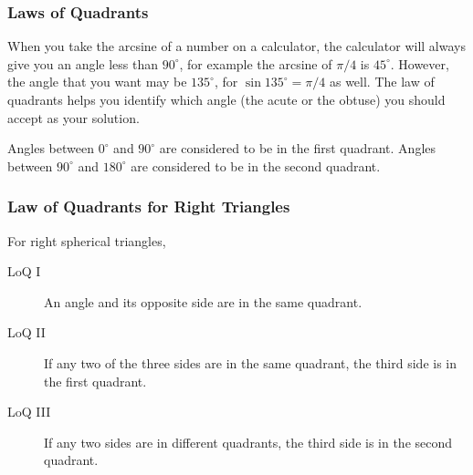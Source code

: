 \documentclass[xcolor=dvipsnames]{beamer}
\begin{document}
\begin{frame}
  \frametitle{Laws of Quadrants}
When you take the arcsine of a number on a calculator, the calculator
will always give you an angle less than $90^{\circ}$, for example the
arcsine of $\pi/4$ is $45^{\circ}$. However, the angle that you want
may be $135^{\circ}$, for $\sin{}135^{\circ}=\pi/4$ as well. The law
of quadrants helps you identify which angle (the acute or the obtuse)
you should accept as your solution.

\bigskip

Angles between $0^{\circ}$ and $90^{\circ}$ are considered to be in
the first quadrant. Angles between $90^{\circ}$ and $180^{\circ}$ are
considered to be in the second quadrant.
\end{frame}

\begin{frame}
  \frametitle{Law of Quadrants for Right Triangles}
For right spherical triangles,
  \begin{description}
  \item[LoQ I] An angle and its opposite side are in the same quadrant.
  \item[LoQ II] If any two of the three sides are in the same quadrant, the
    third side is in the first quadrant.
  \item[LoQ III] If any two sides are in different quadrants, the third side is
    in the second quadrant.
  \end{description}
\end{frame}
\end{document}
